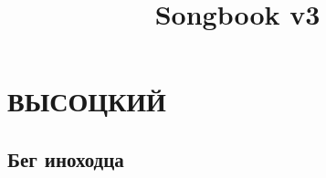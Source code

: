 \documentclass{memoir}
\title{Songbook v3}
\begin{document}
\begin{KeepFromToc} %
\tableofcontents
\end{KeepFromToc}
\clearpage
\section{ВЫСОЦКИЙ}

\clearpage

{\huge
\subsection{Бег иноходца}

}
\end{document}
